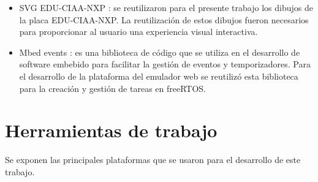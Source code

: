 \begin{itemize}
    \item SVG EDU-CIAA-NXP \citep{SVGFirmwareV3}: se reutilizaron para el presente trabajo los dibujos de la placa EDU-CIAA-NXP. La reutilización de estos dibujos fueron necesarios para proporcionar al usuario una experiencia visual interactiva.
    
     \item Mbed events \citep{ArmMbed}: es una biblioteca de código que se utiliza en el desarrollo de software embebido para facilitar la gestión de eventos y temporizadores. Para el desarrollo de la plataforma del emulador web se reutilizó esta biblioteca para la creación y gestión de tareas en freeRTOS.
     
\end{itemize}


\section{Herramientas de trabajo}
\label{sec:Herramientas de trabajo}

Se exponen las principales plataformas que se usaron para el desarrollo de este trabajo.

